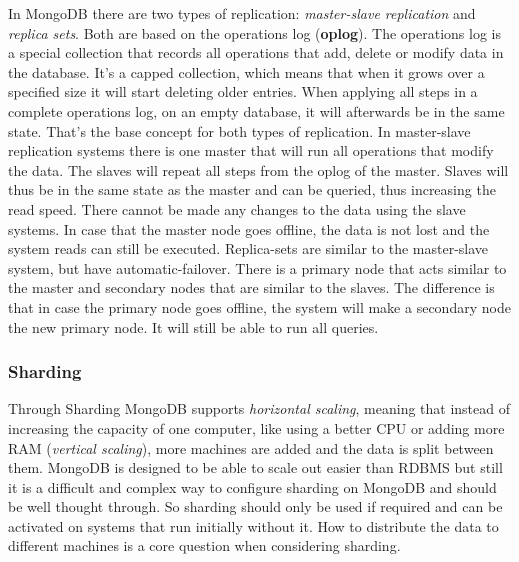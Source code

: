 \documentclass[11pt]{article}
\begin{document}
In MongoDB there are two types of replication: \textit{master-slave replication} and \textit{replica sets}. Both are based on the operations log (\textbf{oplog}).
The operations log is a special collection that records all operations that add, delete or modify data in the database. 
It's a capped collection, which means that when it grows over a specified size it will start deleting older entries. 
When applying all steps in a complete operations log, on an empty database, it will afterwards be in the same state. 
That's the base concept for both types of replication. 
In master-slave replication systems there is one master that will run all operations that modify the data. The slaves will repeat all steps from the oplog of the master.
Slaves will thus be in the same state as the master and can be queried, thus increasing the read speed. There cannot be made any changes to the data using the slave systems.
In case that the master node goes offline, the data is not lost and the system reads can still be executed.
Replica-sets are similar to the master-slave system, but have automatic-failover. There is a primary node that acts similar to the master and secondary nodes that are similar to the slaves. 
The difference is that in case the primary node goes offline, the system will make a secondary node the new primary node. It will still be able to run all queries. 


\subsubsection{Sharding}
Through Sharding MongoDB supports \textit{horizontal scaling}, meaning that instead of increasing the capacity of one computer, like using a better CPU or adding more RAM (\textit{vertical scaling}), more machines are added and the data is split between them. MongoDB is designed to be able to scale out easier than RDBMS but still it is a difficult and complex way to configure sharding on MongoDB and should be well thought through.
\cite{designed_to_scale}
So sharding should only be used if required and can be activated on systems that run initially without it. 
How to distribute the data to different machines is a core question when considering sharding.
\end{document}
